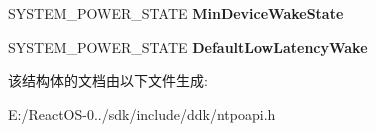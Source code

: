 \begin{DoxyCompactItemize}
\item 
\mbox{\label{struct_s_y_s_t_e_m___p_o_w_e_r___c_a_p_a_b_i_l_i_t_i_e_s_acdedadf6009d06bb2fb4dea859fc7c1e}} 
S\+Y\+S\+T\+E\+M\+\_\+\+P\+O\+W\+E\+R\+\_\+\+S\+T\+A\+TE {\bfseries Min\+Device\+Wake\+State}
\item 
\mbox{\label{struct_s_y_s_t_e_m___p_o_w_e_r___c_a_p_a_b_i_l_i_t_i_e_s_ab634eb9db9a29e0c7d98f2ce73cf7ed6}} 
S\+Y\+S\+T\+E\+M\+\_\+\+P\+O\+W\+E\+R\+\_\+\+S\+T\+A\+TE {\bfseries Default\+Low\+Latency\+Wake}
\end{DoxyCompactItemize}


该结构体的文档由以下文件生成\+:\begin{DoxyCompactItemize}
\item 
E\+:/\+React\+O\+S-\/0../sdk/include/ddk/ntpoapi.\+h\end{DoxyCompactItemize}

